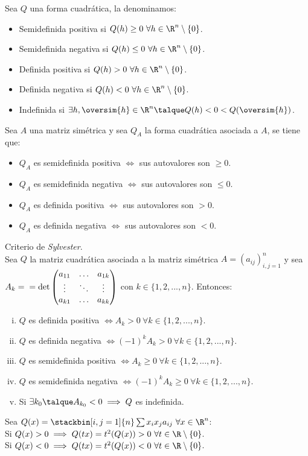 \begin{defi} Sea $Q$ una forma cuadrática, la denominamos:
\begin{itemize}
\item Semidefinida positiva si $Q(h)\geq 0\ \forall h\in\R^n\setminus\{0\}$.
\item Semidefinida negativa si $Q(h)\leq 0\ \forall h\in\R^n\setminus\{0\}$.
\item Definida positiva si $Q(h)> 0\ \forall h\in\R^n\setminus\{0\}$.
\item Definida negativa si $Q(h)< 0\ \forall h\in\R^n\setminus\{0\}$.
\item Indefinida si $\exists h,\oversim{h}\in\R^n\talque Q(h)<0<Q(\oversim{h})$.
\end{itemize}
\end{defi}

\begin{proposicion}
Sea $A$ una matriz simétrica y sea $Q_A$ la forma cuadrática asociada a $A$, se tiene que:
\begin{itemize}
\item $Q_A$ es semidefinida positiva $\iff$ sus autovalores son $\geq 0$.
\item $Q_A$ es semidefinida negativa $\iff$ sus autovalores son $\leq 0$.
\item $Q_A$ es definida positiva $\iff$ sus autovalores son $> 0$.
\item $Q_A$ es definida negativa $\iff$ sus autovalores son $< 0$.
\end{itemize}
\end{proposicion}

\begin{proposicion} Criterio de \textit{Sylvester}.\\
Sea $Q$ la matriz cuadrática asociada a la matriz simétrica $A=(a_{ij})^n_{i,j=1}$ y sea $A_k=\\
=\det\begin{pmatrix}a_{11}&\ldots&a_{1k}\\\vdots&\ddots&\vdots\\a_{k1}&\ldots&a_{kk}\end{pmatrix}$ con $k\in \{1,2,...,n\}$. Entonces:
\begin{enumerate}[i)]
\item $Q$ es definida positiva $\iff A_k>0\ \forall k\in \{1,2,...,n\}$.
\item $Q$ es definida negativa $\iff (-1)^kA_k>0\ \forall k\in \{1,2,...,n\}$.
\item $Q$ es semidefinida positiva $\iff A_k\geq 0\ \forall k\in \{1,2,...,n\}$.
\item $Q$ es semidefinida negativa $\iff (-1)^kA_k\geq 0\ \forall k\in \{1,2,...,n\}$.
\item Si $\exists k_0\talque A_{k_0}<0 \implies Q$ es indefinida.
\end{enumerate}
\end{proposicion}

\begin{observacion} Sea $Q(x)=\stackbin[i,j=1]{n}\sum x_ix_ja_{ij}\ \forall x\in\R^n$:\\
Si $Q(x)>0\implies Q(tx)=t^2(Q(x))>0\ \forall t\in\R\setminus \{0\}$.\\
Si $Q(x)<0\implies Q(tx)=t^2(Q(x))<0\ \forall t\in\R\setminus \{0\}$.
\end{observacion}